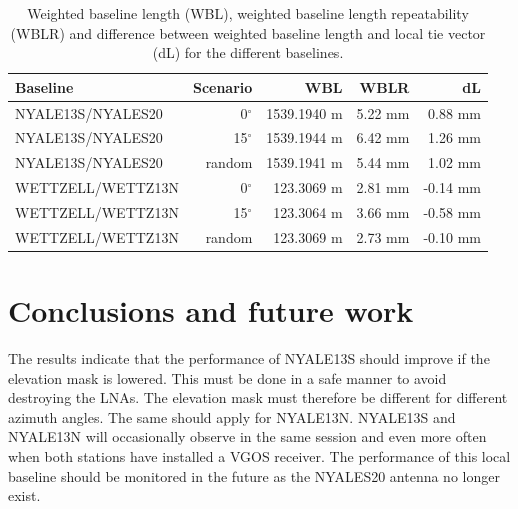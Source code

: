 \documentclass[twoside=semi,fontsize=12pt,paper=a4,titlepage=on]{kv_article}
\begin{document}
\begin{table}[t]
	\begin{tabularx}{\linewidth}{X|r|r|r|r}
	Baseline & Scenario & WBL & WBLR & dL \\
	\hline
	NYALE13S/NYALES20 & {0$^\circ$}  & 1539.1940 m & 5.22 mm &  0.88 mm \\
	NYALE13S/NYALES20 & {15$^\circ$} & 1539.1944 m & 6.42 mm &  1.26 mm \\
	NYALE13S/NYALES20 & random       & 1539.1941 m & 5.44 mm &  1.02 mm \\
	WETTZELL/WETTZ13N & {0$^\circ$}  &  123.3069 m & 2.81 mm & -0.14 mm \\
	WETTZELL/WETTZ13N & {15$^\circ$} &  123.3064 m & 3.66 mm & -0.58 mm \\
	WETTZELL/WETTZ13N & random       &  123.3069 m & 2.73 mm & -0.10 mm \\
	\hline
	\end{tabularx}
\caption{{Weighted baseline length (WBL), weighted baseline length repeatability (WBLR) and difference 
between weighted baseline length and local tie vector (dL) for the different baselines.
}}
\label{tab:baselines}
\end{table}

\section{Conclusions and future work}
The results indicate that the performance of NYALE13S should improve if the elevation mask is lowered. This must be done in a safe manner to avoid destroying the LNAs. The elevation mask must therefore be different for different azimuth angles. The same should apply for NYALE13N. NYALE13S and NYALE13N will occasionally observe in the same session and even more often when both stations have installed a VGOS receiver. The performance of this local baseline should be monitored in the future as the NYALES20 antenna no longer exist. 

\newpage


\end{document}
